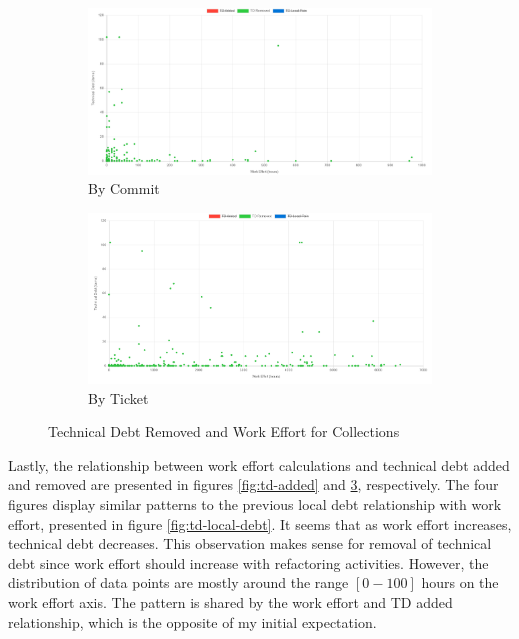 \documentclass{mpaper}
\begin{document}
\begin{figure}
	\centering
	\begin{subfigure}{.45\textwidth}
		\includegraphics[width=\linewidth]{images/collections_removed_debt_commit.png}
		\caption{By Commit}
		\label{fig:td-removed-commit}
	\end{subfigure}
	\begin{subfigure}{.45\textwidth}
		\includegraphics[width=\linewidth]{images/collections_removed_debt_ticket.png}
		\caption{By Ticket}
		\label{fig:td-removed-ticket}
	\end{subfigure}
	\caption{Technical Debt Removed and Work Effort for Collections}
	\label{fig:td-removed}
\end{figure}

Lastly, the relationship between work effort calculations and technical debt
added and removed are presented in figures \ref{fig:td-added} and
\ref{fig:td-removed}, respectively. The four figures display similar patterns to
the previous local debt relationship with work effort, presented in figure
\ref{fig:td-local-debt}. It seems that as work effort increases, technical debt
decreases. This observation makes sense for removal of technical debt since work
effort should increase with refactoring activities. However, the distribution of
data points are mostly around the range $[0-100]$ hours on the work effort axis.
The pattern is shared by the work effort and TD added relationship, which is the
opposite of my initial expectation. \\
\end{document}
